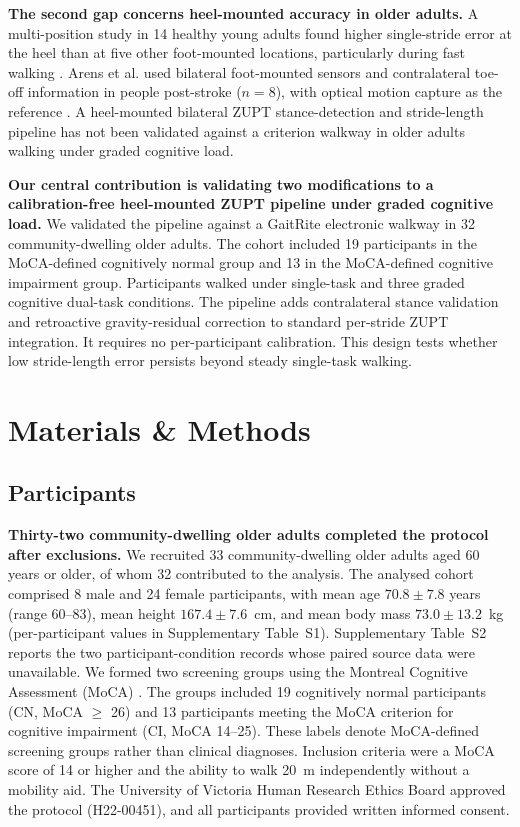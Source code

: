 \documentclass[11pt]{article}
\begin{document}
\textbf{The second gap concerns heel-mounted accuracy in older adults.}
A multi-position study in 14 healthy young adults found higher single-stride error at the heel than at five other foot-mounted locations, particularly during fast walking \citep{Kuderle2022}. Arens et al. used bilateral foot-mounted sensors and contralateral toe-off information in people post-stroke ($n = 8$), with optical motion capture as the reference \citep{Arens2021}. A heel-mounted bilateral ZUPT stance-detection and stride-length pipeline has not been validated against a criterion walkway in older adults walking under graded cognitive load.

\textbf{Our central contribution is validating two modifications to a calibration-free heel-mounted ZUPT pipeline under graded cognitive load.} We validated the pipeline against a GaitRite electronic walkway in 32 community-dwelling older adults. The cohort included 19 participants in the MoCA-defined cognitively normal group and 13 in the MoCA-defined cognitive impairment group. Participants walked under single-task and three graded cognitive dual-task conditions. The pipeline adds contralateral stance validation and retroactive gravity-residual correction to standard per-stride ZUPT integration. It requires no per-participant calibration. This design tests whether low stride-length error persists beyond steady single-task walking.


\clearpage
\section{Materials \& Methods}

\subsection{Participants}

\textbf{Thirty-two community-dwelling older adults completed the protocol after exclusions.}
We recruited 33 community-dwelling older adults aged 60 years or older, of whom 32 contributed to the analysis. The analysed cohort comprised 8 male and 24 female participants, with mean age $70.8 \pm 7.8$ years (range 60--83), mean height $167.4 \pm 7.6$~cm, and mean body mass $73.0 \pm 13.2$~kg (per-participant values in Supplementary Table~S1). Supplementary Table~S2 reports the two participant-condition records whose paired source data were unavailable. We formed two screening groups using the Montreal Cognitive Assessment (MoCA) \citep{Nasreddine2005}. The groups included 19 cognitively normal participants (CN, MoCA $\geq$ 26) and 13 participants meeting the MoCA criterion for cognitive impairment (CI, MoCA 14--25). These labels denote MoCA-defined screening groups rather than clinical diagnoses. Inclusion criteria were a MoCA score of 14 or higher and the ability to walk 20~m independently without a mobility aid. The University of Victoria Human Research Ethics Board approved the protocol (H22-00451), and all participants provided written informed consent.
\end{document}
